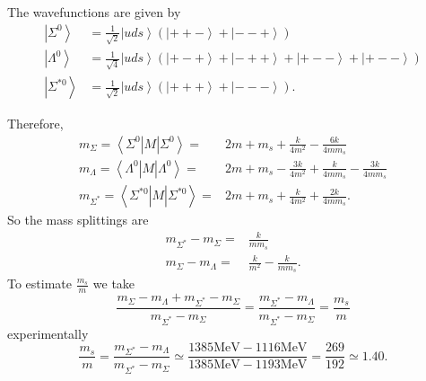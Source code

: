 \documentclass[main.tex]{subfiles}
\begin{document}
The wavefunctions are given by
\begin{align}
\left|\Sigma^0\right>&=\frac{1}{\sqrt{2}}\left|uds\right>(\left|++-\right>+\left|--+\right>)\\
\left|\Lambda^0\right>&=\frac{1}{\sqrt{4}}\left|uds\right>(\left|+-+\right>+\left|-++\right>+\left|+--\right>+\left|+--\right>)\\
\left|\Sigma^{*0}\right>&=\frac{1}{\sqrt{2}}\left|uds\right>(\left|+++\right>+\left|---\right>).
\end{align}

Therefore,
\begin{align}
m_{\Sigma}=\left<\Sigma^0\right|M\left|\Sigma^0\right>=&2m+m_s+\frac{k}{4m^2}-\frac{6k}{4mm_s}\\
m_{\Lambda}=\left<\Lambda^0\right|M\left|\Lambda^0\right>=&2m+m_s-\frac{3k}{4m^2}+\frac{k}{4mm_s}-\frac{3k}{4mm_s}\\
m_{\Sigma^*}=\left<\Sigma^{*0}\right|M\left|\Sigma^{*0}\right>=&2m+m_s+\frac{k}{4m^2}+\frac{2k}{4mm_s}.
\end{align}
So the mass splittings are
\begin{align}
m_{\Sigma^*}-m_{\Sigma}=&\frac{k}{mm_s}\\
m_{\Sigma}-m_{\Lambda}=&\frac{k}{m^2}-\frac{k}{mm_s}.
\end{align}
To estimate $\frac{m_s}{m}$ we take
\begin{equation}
\frac{m_{\Sigma}-m_{\Lambda}+m_{\Sigma^*}-m_{\Sigma}}{m_{\Sigma^*}-m_{\Sigma}}=\frac{m_{\Sigma^*}-m_{\Lambda}}{m_{\Sigma^*}-m_{\Sigma}}=\frac{m_s}{m}
\end{equation}
experimentally
\begin{equation}
\frac{m_s}{m}=\frac{m_{\Sigma^*}-m_{\Lambda}}{m_{\Sigma^*}-m_{\Sigma}}\simeq\frac{1385\text{MeV}-1116\text{MeV}}{1385\text{MeV}-1193\text{MeV}}=\frac{269}{192}\simeq1.40.
\end{equation}
\subsection{}
\end{document}
